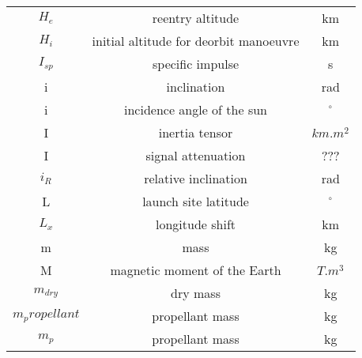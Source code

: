 \begin{center}
\begin{longtable}{c|c|c}
$H_e$                               & reentry altitude     																										& km \\

$H_i$                               & initial altitude for deorbit manoeuvre     															& km \\

$I_{sp}$													 	& specific impulse 																												& s \\

i 																	& inclination 																														& rad \\

i                                   & incidence angle of the sun                 															& $^\circ$ \\

I                                   & inertia tensor                          																& $km.m^2$ \\

I                                   & signal attenuation                         															& ??? \\

$i_R$ 															& relative inclination 																										& rad \\

L                                   & launch site latitude                        														& $^\circ$ \\

$L_x$                               & longitude shift                               													& km \\

m 																	& mass 																																		& kg \\

M                                   & magnetic moment of the Earth                 														& $T.m^3$ \\

$m_{dry}$                           & dry mass                                    														& kg \\

$m_propellant$								    	& propellant mass 																												& kg \\

$m_p$ 															& propellant mass 																												& kg \\


\end{longtable}
\end{center}

